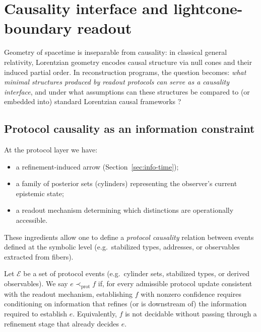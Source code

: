 \section{Causality interface and lightcone-boundary readout}\label{sec:causality}

Geometry of spacetime is inseparable from causality: in classical general relativity, Lorentzian geometry encodes causal structure via null cones and their induced partial order. In reconstruction programs, the question becomes: \emph{what minimal structures produced by readout protocols can serve as a causality interface}, and under what assumptions can these structures be compared to (or embedded into) standard Lorentzian causal frameworks \cite{HawkingEllis1973,MinguzziSanchez2008}?

\subsection{Protocol causality as an information constraint}\label{sec:causality:protocol}

At the protocol layer we have:
\begin{itemize}[leftmargin=*,itemsep=2pt]
  \item a refinement-induced arrow (Section~\ref{sec:info-time});
  \item a family of posterior sets (cylinders) representing the observer's current epistemic state;
  \item a readout mechanism determining which distinctions are operationally accessible.
\end{itemize}

These ingredients allow one to define a \emph{protocol causality} relation between events defined at the symbolic level (e.g.\ stabilized types, addresses, or observables extracted from fibers).

\begin{definition}\label{def:protocol-causality}
Let $\mathcal{E}$ be a set of protocol events (e.g.\ cylinder sets, stabilized types, or derived observables). We say $e \prec_{\mathrm{prot}} f$ if, for every admissible protocol update consistent with the readout mechanism, establishing $f$ with nonzero confidence requires conditioning on information that refines (or is downstream of) the information required to establish $e$. Equivalently, $f$ is not decidable without passing through a refinement stage that already decides $e$.
\end{definition}

